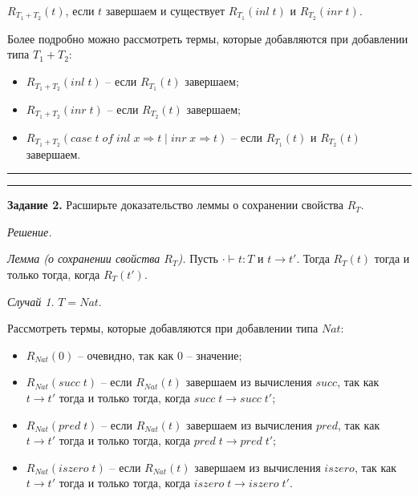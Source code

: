 \documentclass[landscape, 11pt]{report}
\begin{document}
	\vspace{0.2cm}
	
	$R_{T_1 + T_2}(t)$, если $t$ завершаем и существует $R_{T_1}(inl \; t)$ и $R_{T_2}(inr \; t)$.
	
	Более подробно можно рассмотреть термы, которые добавляются при добавлении типа $T_1 + T_2$:
	
	\vspace{-0.2cm}
	
	\begin{itemize}
		\item $R_{T_1 + T_2}(inl \; t)$ -- если $R_{T_1}(t)$ завершаем;
		\item $R_{T_1 + T_2}(inr \; t)$ -- если $R_{T_2}(t)$ завершаем;
		\item $R_{T_1 + T_2}(case \; t \; of \; inl \; x \Rightarrow t \; | \; inr \; x \Rightarrow t)$ -- если $R_{T_1}(t)$ и $R_{T_2}(t)$ завершаем.
	\end{itemize}
	
	\hrule
	\vspace{0.5cm}
	
	\newpage
	
	
	\vspace{-0.5cm}
	\hrule
	\vspace{0.5cm}
	
	\textbf{Задание 2.} Расширьте доказательство леммы о сохранении свойства $R_T$.
	
	\vspace{0.2cm}
	
	\textit{Решение.}
	
	\vspace{0.2cm}
	
	\textit{Лемма (о сохранении свойства $R_T$).} Пусть $\cdot \vdash t : T$ и $t \longrightarrow t'$. Тогда $R_T(t)$ тогда и только тогда, когда $R_T(t')$.
	
	\vspace{0.2cm}

	\textit{Случай 1.} $T = Nat$.

	\vspace{0.2cm}
	
	Рассмотреть термы, которые добавляются при добавлении типа $Nat$:
	
	\begin{itemize}
		\item $R_{Nat}(0)$ -- очевидно, так как 0 -- значение;
		\item $R_{Nat}(succ \; t)$ -- если $R_{Nat}(t)$ завершаем из вычисления $succ$, так как $t \rightarrow t'$ тогда и только тогда, когда $succ \; t \rightarrow succ \; t'$;
		\item $R_{Nat}(pred \; t)$ -- если $R_{Nat}(t)$ завершаем из вычисления $pred$, так как $t \rightarrow t'$ тогда и только тогда, когда $pred \; t \rightarrow pred \; t'$;
		\item $R_{Nat}(iszero \; t)$ -- если $R_{Nat}(t)$ завершаем из вычисления $iszero$, так как $t \rightarrow t'$ тогда и только тогда, когда $iszero \; t \rightarrow iszero \; t'$.
	\end{itemize}
\end{document}
